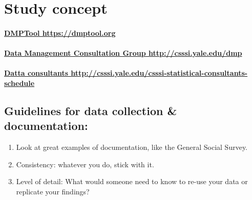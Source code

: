 \documentclass{tufte-handout}
\begin{document}
\newpage

\vspace*{-50pt}
\section{Study concept}\label{study-concept}

\paragraph{\href{https://dmptool.org}{DMPTool https://dmptool.org}}\label{dmptool}

\paragraph{\href{http://csssi.yale.edu/dmp}{Data Management Consultation
Group http://csssi.yale.edu/dmp}}\label{dmp-consultation-group}

\paragraph{\href{http://csssi.yale.edu/csssi-statistical-consultants-schedule}{Datta
consultants http://csssi.yale.edu/csssi-statistical-consultants-schedule} }\label{data-consultants}

\marginnote
{\subsection{Guidelines for data collection \& documentation:}\label{guidelines-doc}
\begin{enumerate}
\def\labelenumi{\arabic{enumi}.}
\itemsep1pt\parskip0pt
\item
  Look at great examples of documentation, like the General Social Survey.
\item
  Consistency: whatever you do, stick with it.
\item
  Level of detail: What would someone need to know to re-use your data or replicate your findings?
\end{enumerate}}
\end{document}
